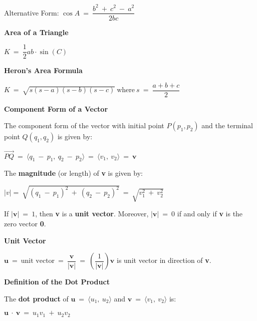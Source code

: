 \documentclass{article}
\begin{document}
\begin{large}
\hspace{0.1in} Alternative Form: $\cos A\ =\ \dfrac{b^{2}\ +\ c^{2}\ -\ a^{2}}{2bc}$

\textbf{Area of a Triangle}

\hspace{2.5in} $K\ =\ \dfrac{1}{2}ab\cdot \sin (C)$

\textbf{Heron's Area Formula}

\hspace{1.0in} $K\ =\ \sqrt{s(s-a)(s-b)(s-c)}\ \text{where}\ s\ =\ \dfrac{a+b+c}{2}$

\textbf{Component Form of a Vector}

\hspace{0.1in} The component form of the vector with initial point $P(p_{1},p_{2})$ and the terminal point $Q(q_{1},q_{2})$ is given by:

\vspace{-0.2in}

\hspace{1.8in} $\overrightarrow{PQ}\ =\ \langle q_{1}\ -\ p_{1},\ q_{2}\ -\ p_{2}\rangle\ =\ \langle v_{1},\ v_{2}\rangle\ =\ \textbf{v}$

\hspace{0.1in} The \textbf{magnitude} (or length) of \textbf{v} is given by:

\hspace{1.5in} $|v| =\ \sqrt{(q_{1}\ -\ p_{1})^{2}\ +\ (q_{2}\ -\ p_{2})^{2}}\ =\ \sqrt{v_{1}^{2}\ +\ v_{2}^{2}}$

\hspace{0.1in} If $| \textbf{v}|\ =\ 1$, then \textbf{v} is a \textbf{unit vector}.  Moreover, $| \textbf{v}|\ =\ 0$ if and only if \textbf{v} is the zero vector \textbf{0}.

\textbf{Unit Vector}

\hspace{1.0in} $\textbf{u}\ =\ \text{unit vector}\ =\ \dfrac{\textbf{v}}{|\textbf{v}|}\ =\ \left(\dfrac{1}{|\textbf{v}|}\right)\textbf{v}$ is unit vector in direction of \textbf{v}.

\textbf{Definition of the Dot Product}

\hspace{1.0in} The \textbf{dot product} of $\textbf{u}\ =\ \langle u_{1},\ u_{2}\rangle$ and $\textbf{v}\ =\ \langle v_{1},\ v_{2}\rangle$ is:

\hspace{2.5in} $\textbf{u}\ \cdot\ \textbf{v}\ =\ u_{1}v_{1}\ +\ u_{2}v_{2}$


\end{large}
\end{document}
